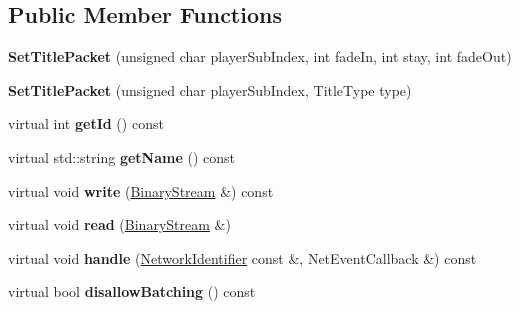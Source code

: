 \subsection*{Public Member Functions}
\begin{DoxyCompactItemize}
\item 
\mbox{\label{struct_set_title_packet_a07fc9faa9630aca0ce99019baecfea84}} 
{\bfseries Set\+Title\+Packet} (unsigned char player\+Sub\+Index, int fade\+In, int stay, int fade\+Out)
\item 
\mbox{\label{struct_set_title_packet_a025e2ef64b37998e5840a665364ce248}} 
{\bfseries Set\+Title\+Packet} (unsigned char player\+Sub\+Index, Title\+Type type)
\item 
\mbox{\label{struct_set_title_packet_a1f428b691f688914fd8c2849fa25e5f9}} 
virtual int {\bfseries get\+Id} () const
\item 
\mbox{\label{struct_set_title_packet_a5c8b4ee236e30f0011ec7c860a0b2077}} 
virtual std\+::string {\bfseries get\+Name} () const
\item 
\mbox{\label{struct_set_title_packet_aa70d4365b4495e3bef89346322aa9a3b}} 
virtual void {\bfseries write} (\mbox{\hyperlink{struct_binary_stream}{Binary\+Stream}} \&) const
\item 
\mbox{\label{struct_set_title_packet_a32664dffd8e517462a75605595cf3e95}} 
virtual void {\bfseries read} (\mbox{\hyperlink{struct_binary_stream}{Binary\+Stream}} \&)
\item 
\mbox{\label{struct_set_title_packet_a50c2c76791100b2600ee0000ced2ad3a}} 
virtual void {\bfseries handle} (\mbox{\hyperlink{struct_network_identifier}{Network\+Identifier}} const \&, Net\+Event\+Callback \&) const
\item 
\mbox{\label{struct_set_title_packet_aec7ece4aedd6663383e6726139505d1b}} 
virtual bool {\bfseries disallow\+Batching} () const
\end{DoxyCompactItemize}
